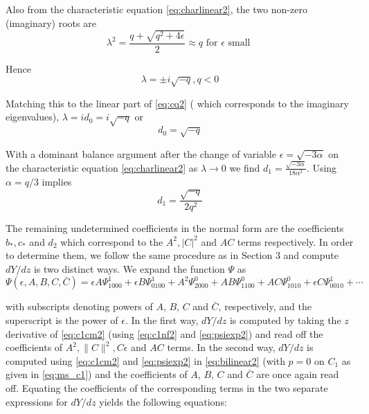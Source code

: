 Also from the characteristic equation \eqref{eq:charlinear2}, the two non-zero 
(imaginary) roots are 
\begin{equation}
\lambda^2 = \frac{ q + \sqrt{q^2 + 4 \epsilon } }{2} \approx q \textrm{ for } \epsilon \textrm{ small }
\end{equation}

Hence
\begin{equation}
\lambda = \pm i \sqrt{-q}, q < 0
\end{equation}

Matching this to the linear part of \eqref{eq:cq2} ( which corresponds to the
imaginary eigenvalues), $\lambda = i d_0 = i \sqrt{-q}$ or 
\begin{equation}
d_0 = \sqrt{-q}
\end{equation}


With a dominant balance argument after the change of variable $\epsilon =
\sqrt{-3 \alpha}$ on the characteristic equation \eqref{eq:charlinear2} as $\lambda \rightarrow 0 $ we
find $d_1 = \frac{ \sqrt{-3 \alpha} }{18 \alpha^2 } $. Using $\alpha=q/3$
implies 
\begin{equation}
d_1 = \frac{\sqrt{-q}}{2 q^2}
\end{equation}

The remaining undetermined coefficients  in the normal form are the 
coefficients $b_*,c_*$ and $d_2$ 
which correspond to the $A^2, |C|^2$ and $AC$ terms respectively. In 
order to determine them, we follow the same procedure as 
in Section 3 and compute $dY/dz$ is two distinct ways. We expand the
function $\Psi$ as
\begin{equation}\label{eq:psiexp2}
\Psi(\epsilon,A,B,C,\bar{C}) = \epsilon A \Psi_{1000}^1 + \epsilon B \Psi_{0100}^1 + A^2 \Psi_{2000}^0 + A B \Psi_{1100}^0 + A C \Psi_{1010}^0 + \epsilon C \Psi_{0010}^1 + \cdots 
\end{equation}

with subscripts denoting powers of $A$, $B$, $C$ and $\bar{C}$, respectively,
and the superscript is the power of $\epsilon$. In the first way, $dY/dz$ is
computed by taking the $z$ derivative of \eqref{eq:c1cm2} (using \eqref{eq:c1nf2}
and \eqref{eq:psiexp2}) and read off the coefficients of $A^2, \|C\|^2, C
\epsilon$ and $AC$ terms.  In the second way, $dY/dz$ is computed using
\eqref{eq:c1cm2} and \eqref{eq:psiexp2} in \eqref{eq:bilinear2} (with $p=0$ on
$C_1$ as given in \eqref{eq:ms_c1}) and the coefficients of  $A$, $B$, $C$ and
$\bar{C}$ are once again read off.  Equating the coefficients of the
corresponding terms in the two separate expressions for $dY/dz$ yields the
following equations:


